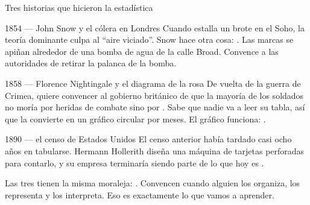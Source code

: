 \documentclass[aspectratio=169,10pt]{beamer}
\begin{document}
\begin{frame}{Tres historias que hicieron la estadística}
  \scriptsize
  \begin{block}{1854 — John Snow y el cólera en Londres}
    \tiny
    Cuando estalla un brote en el Soho, la teoría dominante culpa al ``aire
    viciado''. Snow hace otra cosa: . Las marcas se apiñan alrededor de una bomba de agua de la calle
    Broad. Convence a las autoridades de retirar la palanca de la bomba.
  \end{block}

  \vspace{0.06cm}
  \begin{block}{1858 — Florence Nightingale y el diagrama de la rosa}
    \tiny
    De vuelta de la guerra de Crimea, quiere convencer al gobierno británico
    de que la mayoría de los soldados no moría por heridas de combate sino por
    . Sabe que nadie va a leer
    su tabla, así que la convierte en un gráfico circular por meses. El
    gráfico funciona: .
  \end{block}

  \vspace{0.06cm}
  \begin{block}{1890 — el censo de Estados Unidos}
    \tiny
    El censo anterior había tardado casi ocho años en tabularse. Hermann
    Hollerith diseña una máquina de tarjetas perforadas para contarlo, y su
    empresa terminaría siendo parte de lo que hoy es .
  \end{block}

  \vspace{0.06cm}
  {\tiny\color{uniGris} Las tres tienen la misma moraleja:
  . Convencen cuando alguien los
  organiza, los representa y los interpreta. Eso es exactamente lo que vamos a
  aprender.}
\end{frame}
\end{document}

